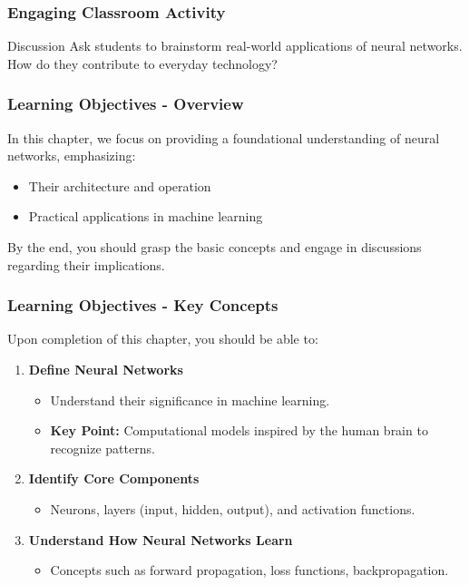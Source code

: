 \documentclass[aspectratio=169]{beamer}
\begin{document}
\begin{frame}[fragile]
    \frametitle{Engaging Classroom Activity}
    \begin{block}{Discussion}
        Ask students to brainstorm real-world applications of neural networks. 
        How do they contribute to everyday technology?
    \end{block}
\end{frame}

\begin{frame}[fragile]
    \frametitle{Learning Objectives - Overview}
    In this chapter, we focus on providing a foundational understanding of neural networks, emphasizing:
    \begin{itemize}
        \item Their architecture and operation
        \item Practical applications in machine learning
    \end{itemize}
    By the end, you should grasp the basic concepts and engage in discussions regarding their implications.
\end{frame}

\begin{frame}[fragile]
    \frametitle{Learning Objectives - Key Concepts}
    Upon completion of this chapter, you should be able to:
    \begin{enumerate}
        \item \textbf{Define Neural Networks}
            \begin{itemize}
                \item Understand their significance in machine learning.
                \item \textbf{Key Point:} Computational models inspired by the human brain to recognize patterns.
            \end{itemize}
        \item \textbf{Identify Core Components}
            \begin{itemize}
                \item Neurons, layers (input, hidden, output), and activation functions.
            \end{itemize}
        \item \textbf{Understand How Neural Networks Learn}
            \begin{itemize}
                \item Concepts such as forward propagation, loss functions, backpropagation.
            \end{itemize}
    \end{enumerate}
\end{frame}
\end{document}
